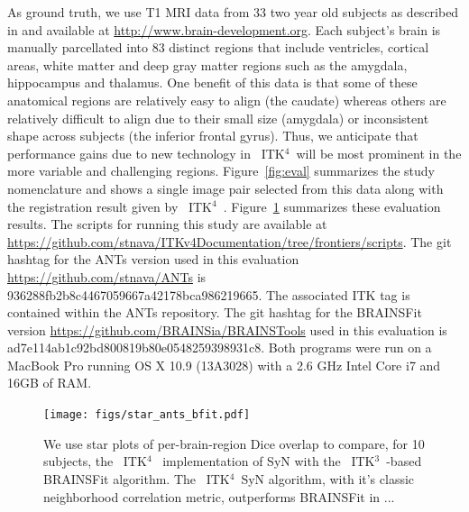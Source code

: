 \documentclass{frontiersSCNS}
\newcommand{\tk}{~ITK$^{\text{4}}$~}
\newcommand{\tkt}{~ITK$^{\text{3}}$~}
\begin{document}
As ground truth, we use T1 MRI data from 33 two year old subjects as
described in \cite{Gousias2008} and available at
\href{http://www.brain-development.org}{http://www.brain-development.org}.
Each subject's brain is manually parcellated into 83 distinct regions
that include ventricles, cortical areas, white matter and deep gray
matter regions such as the amygdala, hippocampus and thalamus.  One
benefit of this data is that some of these anatomical regions are
relatively easy to align (the caudate) whereas others are relatively
difficult to align due to their small size (amygdala) or inconsistent
shape across subjects (the inferior frontal gyrus).  Thus, we
anticipate that performance gains due to new technology in \tk will be
most prominent in the more variable and challenging regions.
Figure~\ref{fig:eval} summarizes the study nomenclature and shows a single image pair selected from this
data along with the registration result given by \tk.
Figure~\ref{fig:antsbfit} summarizes these evaluation results.  
The scripts for running this study are available at
\href{https://github.com/stnava/ITKv4Documentation/tree/frontiers/scripts}{https://github.com/stnava/ITKv4Documentation/tree/frontiers/scripts}.
The git hashtag for the ANTs version used in this evaluation \href{https://github.com/stnava/ANTs}{https://github.com/stnava/ANTs}
is
936288fb2b8c4467059667a42178bca986219665.  The associated ITK tag is contained
within the ANTs repository.  
The git hashtag for the BRAINSFit version \href{https://github.com/BRAINSia/BRAINSTools}{https://github.com/BRAINSia/BRAINSTools} used in this evaluation is
ad7e114ab1c92bd800819b80e0548259398931c8.  Both programs were run on a
MacBook Pro running OS X 10.9 (13A3028) with a 2.6 GHz Intel Core i7 and 16GB of RAM.
\begin{figure}[t]
\begin{center}
\texttt{[image: figs/star\_ants\_bfit.pdf]}
\caption{\baselineskip 12pt \small We use star plots of
  per-brain-region Dice overlap to compare, for 10 subjects, the \tk
  implementation of SyN with the \tkt-based BRAINSFit algorithm.  The
  \tk SyN algorithm, with it's classic neighborhood correlation
  metric, outperforms BRAINSFit in ...}
\label{fig:antsbfit}
\end{center}
\end{figure}
\end{document}
